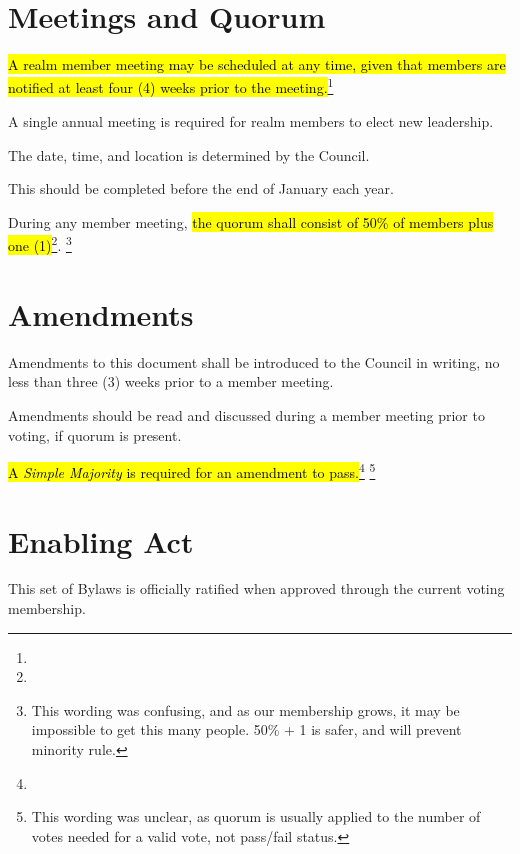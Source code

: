 \documentclass[12pt]{article}
\newcommand{\newpart}[2][]{\hl{#2}\expandafter\ifx\expandafter\relax\detokenize{#1}\relax\else\textnormal{\footnote{#1}}\fi}
\begin{document}
\section{Meetings and Quorum}\label{annual_meeting}
\begin{level} 
    \item \newpart{A realm member meeting may be scheduled at any time, given that members are notified at least four (4) weeks prior to the meeting.}
    \item A single annual meeting is required for realm members to elect new leadership. 
    \begin{level}
        \item The date, time, and location is determined by the Council. 
        \item This should be completed before the end of January each year.
    \end{level}
    \item During any member meeting, \newpart[]{the quorum shall consist of 50\% of members plus one (1)}. \footnote{This wording was confusing, and as our membership grows, it may be impossible to get this many people. 50\% + 1 is safer, and will prevent minority rule.}
\end{level}

\section{Amendments}\label{amendments}
\begin{level} 
    \item Amendments to this document shall be introduced to the Council in writing, no less than three (3) weeks prior to a member meeting. 
    \item Amendments should be read and discussed during a member meeting prior to voting, if quorum is present.
    \item \newpart{A \emph{Simple Majority} is required for an amendment to pass.} \footnote{This wording was unclear, as quorum is usually applied to the number of votes needed for a valid vote, not pass/fail status.}
\end{level}

\section{Enabling Act}
\begin{level} 
    \item This set of Bylaws is officially ratified when approved through the current voting membership.
\end{level}

\end{document}
